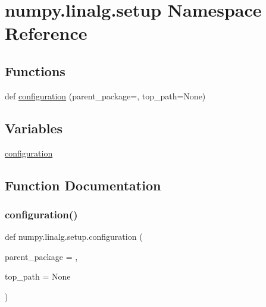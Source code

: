 \hypertarget{namespacenumpy_1_1linalg_1_1setup}{}\section{numpy.\+linalg.\+setup Namespace Reference}
\label{namespacenumpy_1_1linalg_1_1setup}
\subsection*{Functions}
\begin{DoxyCompactItemize}
\item 
def \hyperlink{namespacenumpy_1_1linalg_1_1setup_adf115a4c12ae5416a5809e4a551a9cd1}{configuration} (parent\+\_\+package=\textquotesingle{}\textquotesingle{}, top\+\_\+path=None)
\end{DoxyCompactItemize}
\subsection*{Variables}
\begin{DoxyCompactItemize}
\item 
\hyperlink{namespacenumpy_1_1linalg_1_1setup_aecdc01e2aa88379dd02eaaba57b2943d}{configuration}
\end{DoxyCompactItemize}


\subsection{Function Documentation}
\mbox{\label{namespacenumpy_1_1linalg_1_1setup_adf115a4c12ae5416a5809e4a551a9cd1}} 
\subsubsection{\texorpdfstring{configuration()}{configuration()}}
{\footnotesize\ttfamily def numpy.\+linalg.\+setup.\+configuration (\begin{DoxyParamCaption}\item[{}]{parent\+\_\+package = {\ttfamily \textquotesingle{}\textquotesingle{}},  }\item[{}]{top\+\_\+path = {\ttfamily None} }\end{DoxyParamCaption})}



